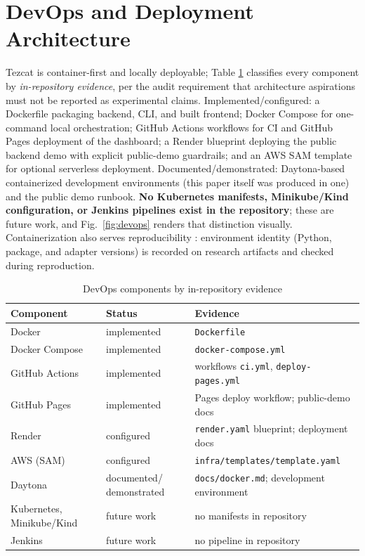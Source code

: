 \documentclass[conference]{IEEEtran}
\newcommand{\tez}{Tezcat}
\begin{document}
\section{DevOps and Deployment Architecture}
\label{sec:devops}
\tez{} is container-first and locally deployable; Table
\ref{tab:devops} classifies every component by \emph{in-repository
evidence}, per the audit requirement that architecture aspirations must
not be reported as experimental claims. Implemented/configured: a
Dockerfile packaging backend, CLI, and built frontend; Docker Compose
for one-command local orchestration; GitHub Actions workflows for CI
and GitHub Pages deployment of the dashboard; a Render blueprint
deploying the public backend demo with explicit public-demo guardrails;
and an AWS SAM template for optional serverless deployment.
Documented/demonstrated: Daytona-based containerized development
environments (this paper itself was produced in one) and the public
demo runbook. \textbf{No Kubernetes manifests, Minikube/Kind
configuration, or Jenkins pipelines exist in the repository}; these are
future work, and Fig.~\ref{fig:devops} renders that distinction
visually. Containerization also serves reproducibility
\cite{boettiger2015}: environment identity (Python, package, and
adapter versions) is recorded on research artifacts and checked during
reproduction.

\begin{table}[t]
\caption{DevOps components by in-repository evidence}
\label{tab:devops}
\centering
\scriptsize
\begin{tabular}{p{2.2cm}p{2.2cm}p{3.1cm}}
\toprule
\textbf{Component} & \textbf{Status} & \textbf{Evidence} \\
\midrule
Docker & implemented & \texttt{Dockerfile} \\
Docker Compose & implemented & \texttt{docker-compose.yml} \\
GitHub Actions & implemented & workflows \texttt{ci.yml},
\texttt{deploy-pages.yml} \\
GitHub Pages & implemented & Pages deploy workflow; public-demo docs \\
Render & configured & \texttt{render.yaml} blueprint; deployment docs \\
AWS (SAM) & configured & \texttt{infra/templates/}\allowbreak\texttt{template.yaml} \\
Daytona & documented/ demonstrated & \texttt{docs/docker.md};
development environment \\
Kubernetes, Minikube/Kind & future work & no manifests in repository \\
Jenkins & future work & no pipeline in repository \\
\bottomrule
\end{tabular}
\end{table}
\end{document}
